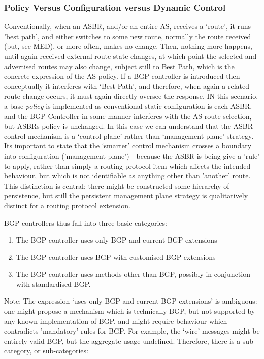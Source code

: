 \subsubsection{Policy Versus Configuration versus Dynamic Control}
Conventionally, when an ASBR, and/or an entire AS, receives a `route', it runs
'best path', and either switches to some new route, normally the route received
(but, see MED), or more often, makes no change.  Then, nothing more happens,
until again received external route state changes, at which point the selected
and advertised routes may also change, subject still to Best Path, which is the
concrete expression of the AS policy.
If a BGP controller is introduced then conceptually it interferes with `Best
Path', and therefore, when again a related route change occurs, it must again
directly oversee the response.	IN this scenario, a base \textit{policy} is
implemented as conventional static configuration is each ASBR, and the BGP
Controller in some manner interferes with the AS route selection, but ASBRs
policy is unchanged.  In this case we can understand that the ASBR control
mechanism is a `control plane' rather than `management plane' strategy.
Its important to state that the `smarter' control mechanism crosses a boundary
into configuration ('management plane') - because the ASBR is being give a
'rule' to apply, rather than simply a routing protocol item which affects the
intended behaviour, but which is not identifiable as anything other than
'another' route.  This distinction is central: there might be constructed some
hierarchy of persistence, but still the persistent management plane strategy is
qualitatively distinct for a routing protocol extension.

BGP controllers thus fall into three basic categories:
\begin{enumerate}
	\item The BGP controller uses only BGP and current BGP extensions
	\item The BGP controller uses BGP with customised BGP extensions
	\item The BGP controller uses methods other than BGP, possibly in conjunction with standardised BGP.
\end{enumerate}

Note: The expression `uses only BGP and current BGP extensions' is ambiguous:
one might propose a mechanism which is technically BGP, but not supported by
any known implementation of BGP, and might require behaviour which contradicts
'mandatory' rules for BGP.  For example, the `wire' messages might be entirely
valid BGP, but the aggregate usage undefined.  Therefore, there is a
sub-category, or sub-categories:

